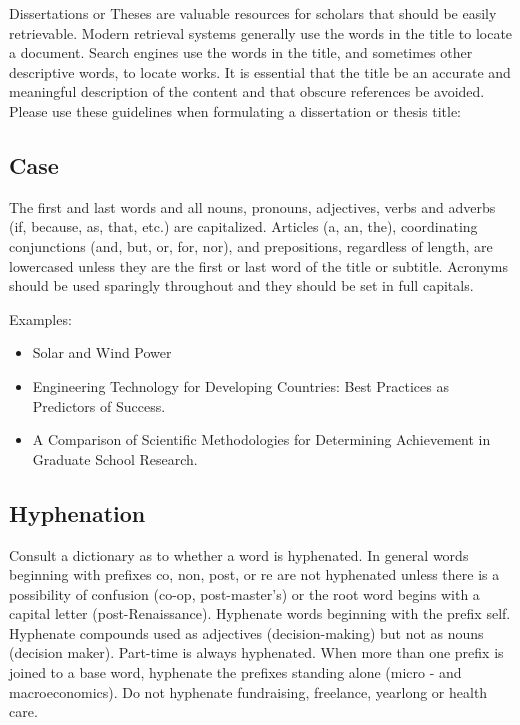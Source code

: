Dissertations or Theses are valuable resources for scholars that should be easily retrievable. Modern retrieval systems generally use the words in the title to locate a document. Search engines use the words in the title, and sometimes other descriptive words, to locate works. It is essential that the title be an accurate and meaningful description of the content and that obscure references be avoided. Please use these guidelines when formulating a dissertation or thesis title:

\subsection{Case}

The first and last words and all nouns, pronouns, adjectives, verbs and adverbs (if, because, as, that, etc.) are capitalized. Articles (a, an, the), coordinating conjunctions (and, but, or, for, nor), and prepositions, regardless of length, are lowercased unless they are the first or last word of the title or subtitle. Acronyms should be used sparingly throughout and they should be set in full capitals.

Examples:

\begin{itemize}
\item Solar and Wind Power
\item Engineering Technology for Developing Countries: Best Practices as Predictors of Success.
\item A Comparison of Scientific Methodologies for Determining Achievement in Graduate School Research.

\end{itemize}

\subsection{Hyphenation}

Consult a dictionary as to whether a word is hyphenated. In general words beginning with prefixes co, non, post, or re are not hyphenated unless there is a possibility of confusion (co-op, post-master's) or the root word begins with a capital letter (post-Renaissance). Hyphenate words beginning with the prefix self. Hyphenate compounds used as adjectives (decision-making) but not as nouns (decision maker). Part-time is always hyphenated. When more than one prefix is joined to a base word, hyphenate the prefixes standing alone (micro - and macroeconomics). Do not hyphenate fundraising, freelance, yearlong or health care.

